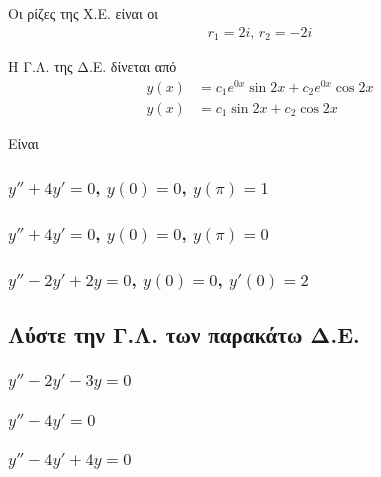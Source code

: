 \documentclass[]{extarticle}
\begin{document}
\begin{multicols*}{2}
    Οι ρίζες της Χ.Ε. είναι οι
    \begin{equation*}
        \begin{aligned}
            r_1 = 2i \text{, } r_2 = -2i
        \end{aligned}
    \end{equation*}

    Η Γ.Λ. της Δ.Ε. δίνεται από
    \begin{equation*}
        \begin{aligned}
            y(x) & = c_1 e^{0x} \sin{2x} + c_2 e^{0x} \cos{2x} \\
            y(x) & = c_1 \sin{2x} + c_2 \cos{2x}
        \end{aligned}
    \end{equation*}

    Είναι

    \subsubsection{\( y'' + 4y' = 0\), \( y(0) = 0 \), \( y(\pi) = 1 \)}
    \subsubsection{\( y'' + 4y' = 0\), \( y(0) = 0 \), \( y(\pi) = 0 \)}
    \subsubsection{\( y'' - 2y' + 2y = 0\), \( y(0) = 0 \), \( y'(0) = 2 \)}
    \subsection{Λύστε την Γ.Λ. των παρακάτω Δ.Ε.}
    \subsubsection{\( y'' - 2y' - 3y = 0\)}
    \subsubsection{\( y'' - 4y' = 0\)}
    \subsubsection{\( y'' - 4y' + 4y = 0\)}
\end{multicols*}
\end{document}
